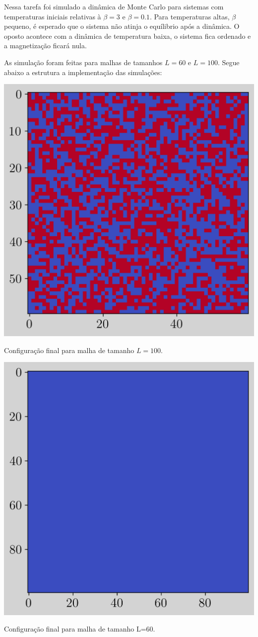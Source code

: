 Nessa tarefa foi simulado a dinâmica de Monte Carlo para sistemas com temperaturas
iniciais relativas à $\beta = 3$ e $\beta = 0.1$. Para temperaturas altas, $\beta$ pequeno, 
é esperado que o sistema não atinja o equílibrio após a dinâmica. O oposto acontece com 
a dinâmica de temperatura baixa, o sistema fica ordenado e a magnetização ficará nula.

As simulação foram feitas para malhas de tamanhos $L = 60$ e $L = 100$. Segue abaixo a estrutura 
a implementação das simulações:

\begin{marginfigure}
    \centering
    \includegraphics[width=\linewidth]{graficos/tarefa-1/graf-tarefa-A1-conf-L100.png}
    \caption{Configuração final para malha de tamanho $L=100$.}
    \label{fig:a1_l100}
\end{marginfigure}

\begin{marginfigure}
    \centering
    \includegraphics[width=0.6\linewidth]{graficos/tarefa-1/graf-tarefa-A2-conf-L60.png}
    \caption{Configuração final para malha de tamanho L=60.}
\end{marginfigure}

